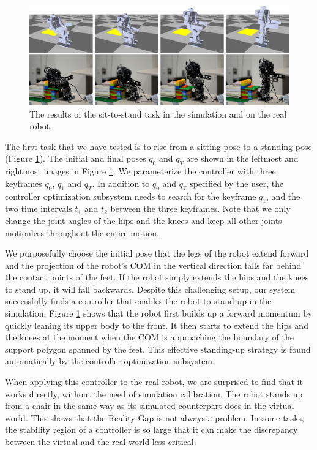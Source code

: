 \begin{figure}[!t]
  \centering
  \includegraphics[width=\textwidth]{figures/sit2Stand}
  \caption{The results of the sit-to-stand task in the simulation and on the real robot.}
  \label{fig:sit2Stand}
\end{figure}

The first task that we have tested is to rise from a sitting pose to a standing pose (Figure \ref{fig:sit2Stand}). The initial and final poses $q_0$ and $q_T$ are shown in the leftmost and rightmost images in Figure \ref{fig:sit2Stand}. We parameterize the controller with three keyframes $q_0$, $q_1$ and $q_T$. In addition to $q_0$ and $q_T$ specified by the user, the controller optimization subsystem needs to search for the keyframe $q_1$, and the two time intervals $t_1$ and $t_2$ between the three keyframes. Note that we only change the joint angles of the hips and the knees and keep all other joints motionless throughout the entire motion.

We purposefully choose the initial pose that the legs of the robot extend forward and the projection of the robot's COM in the vertical direction falls far behind the contact points of the feet. If the robot simply extends the hips and the knees to stand up, it will fall backwards. Despite this challenging setup, our system successfully finds a controller that enables the robot to stand up in the simulation. Figure \ref{fig:sit2Stand} shows that the robot first builds up a forward momentum by quickly leaning its upper body to the front. It then starts to extend the hips and the knees at the moment when the COM is approaching the boundary of the support polygon spanned by the feet. This effective standing-up strategy is found automatically by the controller optimization subsystem.

When applying this controller to the real robot, we are surprised to find that it works directly, without the need of simulation calibration. The robot stands up from a chair in the same way as its simulated counterpart does in the virtual world. This shows that the Reality Gap is not always a problem. In some tasks, the stability region of a controller is so large that it can make the discrepancy between the virtual and the real world less critical.

